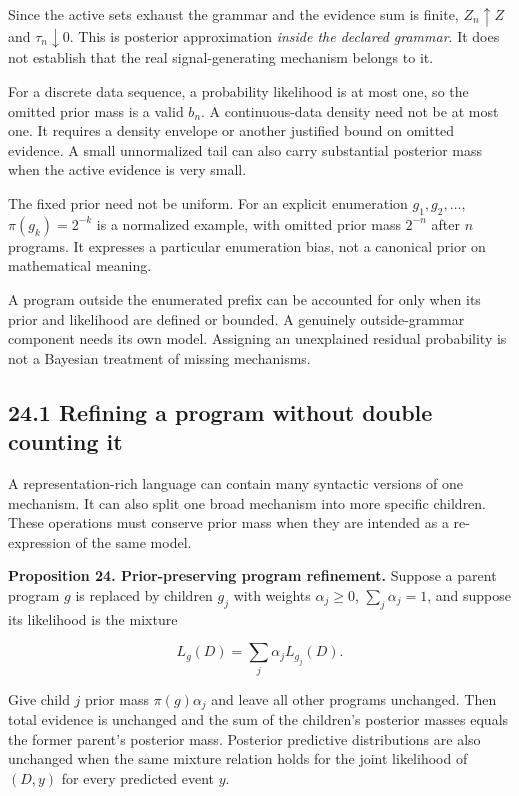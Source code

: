 Since the active sets exhaust the grammar and the evidence sum is
finite, \(Z_n\uparrow Z\) and \(\tau_n\downarrow0\). This is posterior
approximation \emph{inside the declared grammar}. It does not establish
that the real signal-generating mechanism belongs to it.

For a discrete data sequence, a probability likelihood is at most one,
so the omitted prior mass is a valid \(b_n\). A continuous-data density
need not be at most one. It requires a density envelope or another
justified bound on omitted evidence. A small unnormalized tail can also
carry substantial posterior mass when the active evidence is very small.

The fixed prior need not be uniform. For an explicit enumeration
\(g_1,g_2,\ldots\), \(\pi(g_k)=2^{-k}\) is a normalized example, with
omitted prior mass \(2^{-n}\) after \(n\) programs. It expresses a
particular enumeration bias, not a canonical prior on mathematical
meaning.

A program outside the enumerated prefix can be accounted for only when
its prior and likelihood are defined or bounded. A genuinely
outside-grammar component needs its own model. Assigning an unexplained
residual probability is not a Bayesian treatment of missing mechanisms.

\subsection{24.1 Refining a program without double counting
it}\label{LSM:refining-a-program-without-double-counting-it}

A representation-rich language can contain many syntactic versions of
one mechanism. It can also split one broad mechanism into more specific
children. These operations must conserve prior mass when they are
intended as a re-expression of the same model.

\textbf{Proposition 24. Prior-preserving program refinement.} Suppose a
parent program \(g\) is replaced by children \(g_j\) with weights
\(\alpha_j\geq0\), \(\sum_j\alpha_j=1\), and suppose its likelihood is
the mixture

\[
L_g(D)=\sum_j\alpha_jL_{g_j}(D).
\]

Give child \(j\) prior mass \(\pi(g)\alpha_j\) and leave all other
programs unchanged. Then total evidence is unchanged and the sum of the
children's posterior masses equals the former parent's posterior mass.
Posterior predictive distributions are also unchanged when the same
mixture relation holds for the joint likelihood of \((D,y)\) for every
predicted event \(y\).

